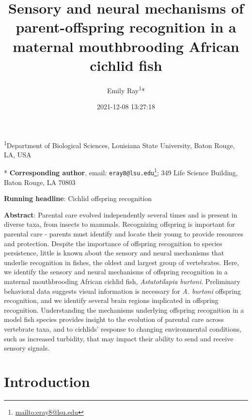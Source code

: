 \documentclass[
  12pt,
]{article}
\title{Sensory and neural mechanisms of parent-offspring recognition in a maternal mouthbrooding African cichlid fish}
\author{Emily Ray\textsuperscript{1}*}
\date{2021-12-08 13:27:18}
\DeclareRobustCommand{\href}[2]{#2\footnote{\url{#1}}}
\begin{document}
\maketitle

\footnotesize

\textsuperscript{1}Department of Biological Sciences, Louisiana State University, Baton Rouge, LA, USA

* \textbf{Corresponding author}, email: \href{mailto:eray8@lsu.edu}{\nolinkurl{eray8@lsu.edu}}; 349 Life Science Building, Baton Rouge, LA 70803

\normalsize

\textbf{Running headline}: Cichlid offspring recognition

\textbf{Abstract}: Parental care evolved independently several times and is present in diverse taxa, from insects to mammals. Recognizing offspring is important for parental care - parents must identify and locate their young to provide resources and protection. Despite the importance of offspring recognition to species persistence, little is known about the sensory and neural mechanisms that underlie recognition in fishes, the oldest and largest group of vertebrates. Here, we identify the sensory and neural mechanisms of offspring recognition in a maternal mouthbrooding African cichlid fish, \emph{Astatotilapia burtoni}. Preliminary behavioral data suggests visual information is necessary for \emph{A. burtoni} offspring recognition, and we identify several brain regions implicated in offspring recognition. Understanding the mechanisms underlying offspring recognition in a model fish species provides insight to the evolution of parental care across vertebrate taxa, and to cichlids' response to changing environmental conditions, such as increased turbidity, that may impact their ability to send and receive sensory signals.

\clearpage

\hypertarget{introduction}{%
\section{Introduction}\label{introduction}}
\end{document}

